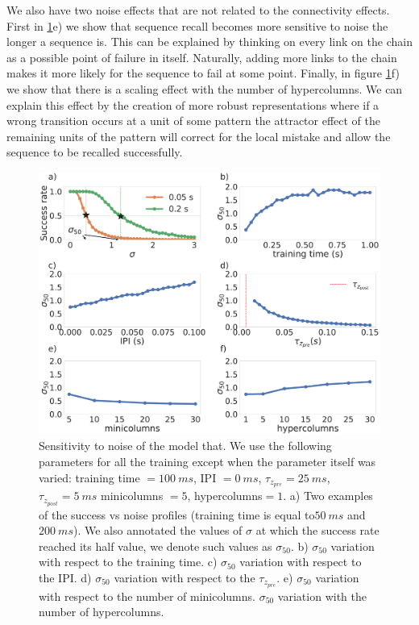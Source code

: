 \documentclass[10pt,a4paper]{article}
\begin{document}
We also have two noise effects that are not related to the connectivity effects. First in \ref{fig:noise_sensitivity}e) we show that sequence recall becomes more sensitive to noise the longer a sequence is. This can be explained by thinking on every link on the chain as a possible point of failure in itself. Naturally, adding more links to the chain makes it more likely for the sequence to fail at some point. Finally, in figure \ref{fig:noise_sensitivity}f) we show that there is a scaling effect with the number of hypercolumns. We can explain this effect by the creation of more robust representations where if a wrong transition occurs at a unit of some pattern the attractor effect of the remaining units of the pattern will correct for the local mistake and allow the sequence to be recalled successfully.

\begin{figure}[H]
\centering
\includegraphics[scale=0.20]{noise_robustness.pdf}
\caption{Sensitivity to noise of the model that.  We use the following parameters for all the training except when the parameter itself was varied: training time $= 100 \: ms$, IPI $= 0 \: ms$, $\tau_{z_{pre}} = 25 \: ms$, $\tau_{z_{post}} = 5 \: ms$ minicolumns $=5$, hypercolumns$=1$. a) Two examples of the success vs noise profiles (training time is equal to$50 \: ms$ and $200 \: ms$). We also annotated the values of $\sigma$ at which the success rate reached its half value, we denote such values as $\sigma_{50}$. b) $\sigma_{50}$ variation with respect to the training time. c) $\sigma_{50}$ variation with respect to the IPI. d) $\sigma_{50}$ variation with respect to the $\tau_{z_{pre}}$. e) $\sigma_{50}$ variation with respect to the number of minicolumns. $\sigma_{50}$ variation with the number of hypercolumns. }
\label{fig:noise_sensitivity}
\end{figure}
\end{document}
